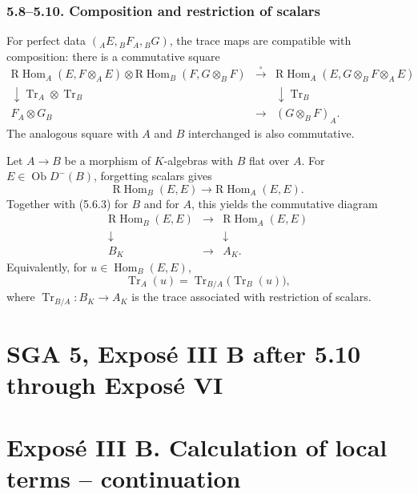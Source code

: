 \documentclass[11pt]{article}
\theoremstyle{plain}
\theoremstyle{definition}
\theoremstyle{remark}
\DeclareMathOperator{\Hom}{Hom}
\DeclareMathOperator{\ob}{Ob}
\DeclareMathOperator{\Tr}{Tr}
\newcommand{\R}{\mathrm R}
\begin{document}
\subsubsection*{5.8--5.10. Composition and restriction of scalars}
For perfect data $({}_AE,{}_BF_A,{}_BG)$, the trace maps are compatible with composition: there is a commutative square
\[
\begin{array}{ccc}
\R\Hom_A(E,F\otimes_AE)\otimes\R\Hom_B(F,G\otimes_BF) & \xrightarrow{\circ} & \R\Hom_A(E,G\otimes_BF\otimes_AE)\\
\downarrow \Tr_A\otimes\Tr_B && \downarrow \Tr_B\\
F_A\otimes G_B & \longrightarrow & (G\otimes_BF)_A.
\end{array}
\]
The analogous square with $A$ and $B$ interchanged is also commutative.

Let $A\to B$ be a morphism of $K$-algebras with $B$ flat over $A$. For $E\in\ob D^-(B)$, forgetting scalars gives
\begin{equation}
   \R\Hom_B(E,E)\to \R\Hom_A(E,E).                                 \tag{5.10.1}
\end{equation}
Together with (5.6.3) for $B$ and for $A$, this yields the commutative diagram
\[
\begin{array}{ccc}
\R\Hom_B(E,E) & \to & \R\Hom_A(E,E)\\
\downarrow && \downarrow\\
B_K & \to & A_K .
\end{array}
\]
Equivalently, for $u\in\Hom_B(E,E)$,
\begin{equation}
   \Tr_A(u)=\Tr_{B/A}\bigl(\Tr_B(u)\bigr),                         \tag{5.10.3}
\end{equation}
where $\Tr_{B/A}:B_K\to A_K$ is the trace associated with restriction of scalars.

\bigskip


\clearpage
\section*{SGA 5, Exposé III B after 5.10 through Exposé VI}

\bigskip

\section*{Exposé III B. Calculation of local terms -- continuation}
\end{document}
